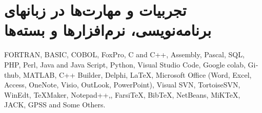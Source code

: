 \documentclass[11pt,a4paper]{bidimoderncv}
\begin{document}
\section{تجربیات و مهارت‌ها در زبانهای برنامه‌نویسی، نرم‌افزارها و بسته‌ها}
\begin{flushleft}
\begin{latin}
{FORTRAN, BASIC, COBOL, FoxPro, C and C++, Assembly, Pascal, SQL, PHP, Perl, Java and Java Script, Python, Visual Studio Code, Google colab, Github,
 MATLAB, C++ Builder, Delphi, \LaTeX, Microsoft Office (Word, Excel, Access, OneNote, Visio,
 OutLook, PowerPoint), Visual SVN, TortoiseSVN, WinEdt, TeXMaker, Notepad++,\XePersian, 
 Farsi\TeX, Bib\TeX, NetBeans, MiKTeX, JACK, GPSS and Some Others.}
\end{latin}
\end{flushleft}

\end{document}
